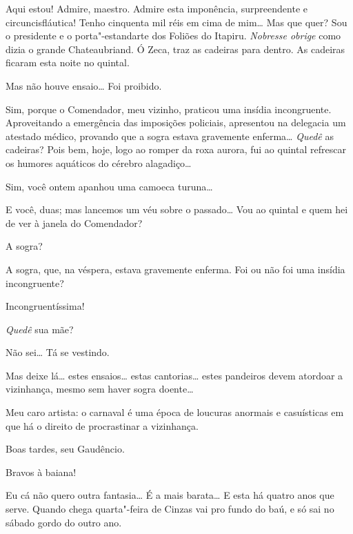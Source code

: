  Aqui estou! Admire, maestro. Admire esta imponência,
surpreendente e circuncisfláutica! Tenho cinquenta mil réis em cima de mim\ldots{} 
Mas que quer? Sou o presidente e o porta"-estandarte dos Foliões do
Itapiru. \textit{Nobresse obrige} como dizia o grande
Chateaubriand.  Ó Zeca, traz as cadeiras para dentro.  As cadeiras ficaram esta noite no quintal.

 Mas não houve ensaio\ldots{}  Foi proibido.

 Sim, porque o Comendador, meu vizinho, praticou uma
insídia incongruente.  Aproveitando a emergência das imposições policiais,
apresentou na delegacia um atestado médico, provando que a sogra estava
gravemente enferma\ldots{}  \textit{Quedê} as
cadeiras? 
  Pois bem, hoje, logo ao romper
da roxa aurora, fui ao quintal refrescar os humores aquáticos do cérebro
alagadiço\ldots

 Sim, você ontem apanhou uma camoeca turuna\ldots

 E você, duas; mas lancemos um véu sobre o passado\ldots{} Vou ao
quintal e quem hei de ver à janela do Comendador?

 A sogra?

 A sogra, que, na véspera, estava gravemente enferma. Foi
ou não foi uma insídia incongruente?

 Incongruentíssima!

  \textit{Quedê} sua mãe?

 Não sei\ldots{} Tá se vestindo. 

 Mas deixe lá\ldots{} estes ensaios\ldots{} estas cantorias\ldots{} estes
pandeiros devem atordoar a vizinhança, mesmo sem haver sogra doente\ldots

 Meu caro artista: o carnaval é uma época de loucuras
anormais e casuísticas em que há o direito de procrastinar a vizinhança.

\vfil{}



  Boas tardes, seu Gaudêncio.

 Bravos à baiana!

 Eu cá não quero outra fantasia\ldots{} É a mais barata\ldots{} E
esta há quatro anos que serve. Quando chega quarta"-feira de Cinzas vai pro fundo
do baú, e só sai no sábado gordo do outro ano.

